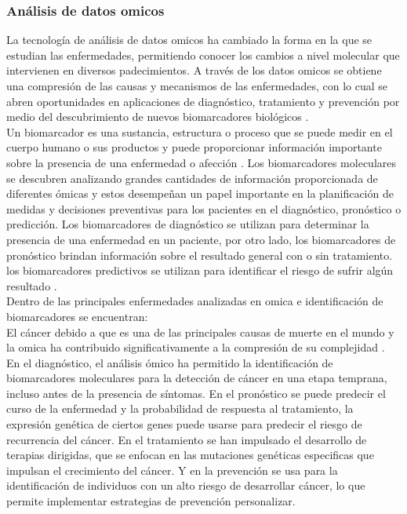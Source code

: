 \subsubsection{Análisis de datos omicos}

La tecnología de análisis de datos omicos ha cambiado la forma en la que se estudian las enfermedades, permitiendo conocer los cambios a nivel molecular que intervienen en diversos padecimientos. A través de los datos omicos se obtiene una compresión de las causas y mecanismos de las enfermedades, con lo cual se abren oportunidades en aplicaciones de diagnóstico, tratamiento y prevención por medio del descubrimiento de nuevos biomarcadores biológicos \citep{reel2021using}.\\

Un biomarcador es una sustancia, estructura o proceso que se puede medir en el cuerpo humano o sus productos y puede proporcionar información importante sobre la presencia de una enfermedad o afección \citep{strimbu2010biomarkers}. Los biomarcadores moleculares se descubren analizando grandes cantidades de información proporcionada de diferentes ómicas y estos desempeñan un papel importante en la planificación de medidas y decisiones preventivas para los pacientes en el diagnóstico, pronóstico o predicción. Los biomarcadores de diagnóstico se utilizan para determinar la presencia de una enfermedad en un paciente, por otro lado, los biomarcadores de pronóstico brindan información sobre el resultado general con o sin tratamiento. los biomarcadores predictivos se utilizan para identificar el riesgo de sufrir algún resultado \citep{carlomagno2017diagnostic}.\\

Dentro de las principales enfermedades analizadas en omica e identificación de biomarcadores se encuentran:\\

El cáncer debido a que es una de las principales causas de muerte en el mundo y la omica ha contribuido significativamente a la compresión de su complejidad \citep{sarmiento2020aplicaciones}. En el diagnóstico, el análisis ómico ha permitido la identificación de biomarcadores moleculares para la detección de cáncer en una etapa temprana, incluso antes de la presencia de síntomas. En el pronóstico se puede predecir el curso de la enfermedad y la probabilidad de respuesta al tratamiento, la expresión genética de ciertos genes puede usarse para predecir el riesgo de recurrencia del cáncer. En el tratamiento se han impulsado el desarrollo de terapias dirigidas, que se enfocan en las mutaciones genéticas especificas que impulsan el crecimiento del cáncer. Y en la prevención se usa para la identificación de individuos con un alto riesgo de desarrollar cáncer, lo que permite implementar estrategias de prevención personalizar\citep{munir2019cancer}.\\

